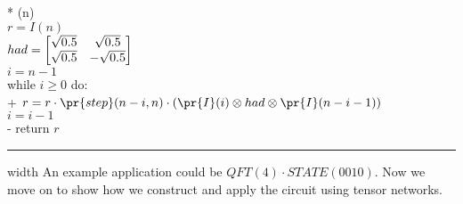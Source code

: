 \begin{pseudo}[kw]*
    (n) \\
    $r = I(n)$  \\
    $had=\begin{bmatrix} \sqrt{0.5} & \sqrt{0.5}\\ \sqrt{0.5} & -\sqrt{0.5}\\ \end{bmatrix}$ \\
    $i=n-1$\\
    while $i\geq 0$ do:\\+
    $r = r \cdot \pr{step}(n-i,n) \cdot (\pr{I}(i)\otimes had \otimes\pr{I}(n-i-1))$ \\
    $i = i-1$\\-
    return $r$ \\  
\end{pseudo}
\hrule width \textwidth
\vspace{\baselineskip}
\noindent
An example application could be $QFT(4)\cdot STATE(0010)$.
Now we move on to show how we construct and apply the circuit using tensor networks.
